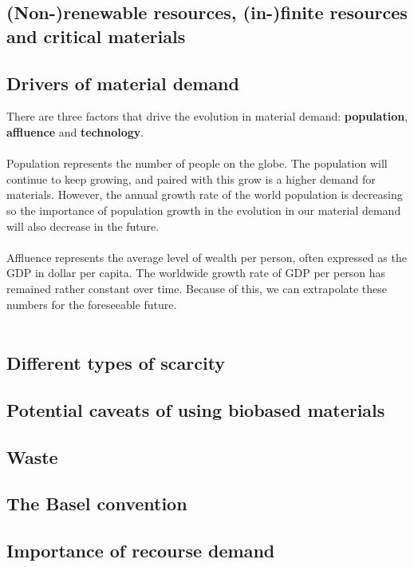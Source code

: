 \documentclass[../summary.tex]{subfiles}
\begin{document}
	\subsection{(Non-)renewable resources, (in-)finite resources and critical materials}
	
	\subsection{Drivers of material demand}
	There are three factors that drive the evolution in material demand: \textbf{population}, \textbf{affluence} and \textbf{technology}. 
	\\
	\\
	Population represents the number of people on the globe. The population will continue to keep growing, and paired with this grow is a higher demand for materials. However, the annual growth rate of the world population is decreasing so the importance of population growth in the evolution in our material demand will also decrease in the future.
	\\
	\\
	Affluence represents the average level of wealth per person, often expressed as the GDP in dollar per capita. The worldwide growth rate of GDP per person has remained rather constant over time. Because of this, we can extrapolate these numbers for the foreseeable future.
	\\
	\\
	
	
	\subsection{Different types of scarcity}
	
	\subsection{Potential caveats of using biobased materials}
	
	\subsection{Waste}
	
	\subsection{The Basel convention}
	
	\subsection{Importance of recourse demand}
	
\end{document}
